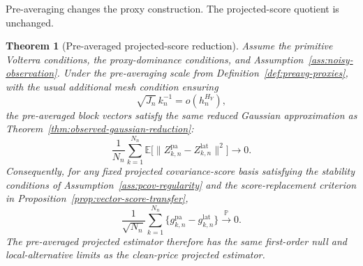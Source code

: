 \documentclass[11pt,a4paper]{amsart}
\theoremstyle{plain}
\newtheorem{theorem}{Theorem}[section]
\theoremstyle{definition}
\theoremstyle{remark}
\newcommand{\PP}{\mathbb{P}}
\newcommand{\EE}{\mathbb{E}}
\newcommand{\toP}{\xrightarrow{\PP}}
\begin{document}
Pre-averaging changes the proxy construction.  The projected-score quotient is unchanged.

\begin{theorem}[Pre-averaged projected-score reduction]\label{thm:preavg-pcov}
Assume the primitive Volterra conditions, the proxy-dominance conditions, and
Assumption~\ref{ass:noisy-observation}.  Under the pre-averaging scale from
Definition~\ref{def:preavg-proxies}, with the usual additional mesh condition ensuring
\[
        \sqrt{J_n}\,k_n^{-1}=o(h_n^{H_Y}),
\]
the pre-averaged block vectors satisfy the same reduced Gaussian approximation as
Theorem~\ref{thm:observed-gaussian-reduction}:
\[
        \frac1{N_n}\sum_{k=1}^{N_n}
        \EE\bigl[
        \|Z_{k,n}^{\mathrm{pa}}-Z_{k,n}^{\mathrm{lat}}\|^2
        \bigr]
        \to0.
\]
Consequently, for any fixed projected covariance-score basis satisfying the stability conditions of
Assumption~\ref{ass:pcov-regularity} and the score-replacement criterion in
Proposition~\ref{prop:vector-score-transfer},
\[
        \frac1{\sqrt{N_n}}\sum_{k=1}^{N_n}
        \{g_{k,n}^{\mathrm{pa}}-g_{k,n}^{\mathrm{lat}}\}
        \toP 0.
\]
The pre-averaged projected estimator therefore has the same first-order null and local-alternative
limits as the clean-price projected estimator.
\end{theorem}
\end{document}
